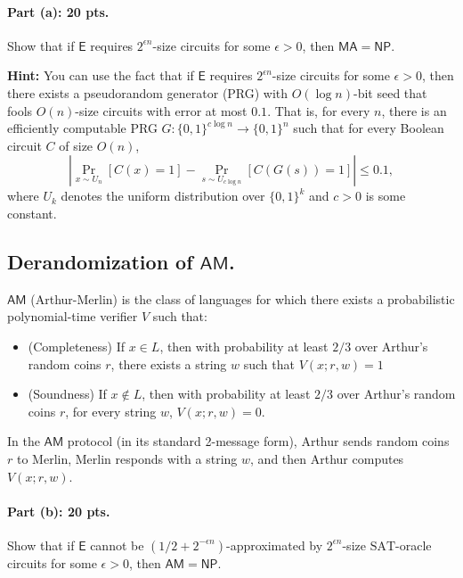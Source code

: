 \documentclass[12pt]{article}
\begin{document}
\paragraph{Part (a): 20 pts.} 

Show that if $\mathsf{E}$ requires $2^{\epsilon n}$-size circuits for some $\epsilon > 0$, then $\mathsf{MA} = \mathsf{NP}$.

\textbf{Hint:}
You can use the fact that if $\mathsf{E}$ requires $2^{\epsilon n}$-size circuits for some $\epsilon > 0$, then there exists a pseudorandom generator (PRG) with $O(\log n)$-bit seed that fools $O(n)$-size circuits with error at most $0.1$. That is, for every $n$, there is an efficiently computable PRG $G : \{0,1\}^{c\log n} \to \{0,1\}^n$ such that for every Boolean circuit $C$ of size $O(n)$,
\[
\left| \Pr_{x \sim U_n}[C(x) = 1] - \Pr_{s \sim U_{c\log n}}[C(G(s)) = 1] \right| \leq 0.1,
\]
where $U_k$ denotes the uniform distribution over $\{0,1\}^k$ and $c > 0$ is some constant.

\subsection{Derandomization of $\mathsf{AM}$.}

$\mathsf{AM}$ (Arthur-Merlin) is the class of languages for which there exists a probabilistic polynomial-time verifier $V$ such that:
\begin{itemize}
    \item (Completeness) If $x \in L$, then with probability at least $2/3$ over Arthur's random coins $r$, there exists a string $w$ such that $V(x; r, w) = 1$
    \item (Soundness) If $x \notin L$, then with probability at least $2/3$ over Arthur's random coins $r$, for every string $w$, $V(x; r, w) = 0$.
\end{itemize}
In the $\mathsf{AM}$ protocol (in its standard 2-message form), Arthur sends random coins $r$ to Merlin, Merlin responds with a string $w$, and then Arthur computes $V(x; r, w)$.


\paragraph{Part (b): 20 pts.} 

\newcommand{\SAT}{\text{SAT}}

Show that if $\mathsf{E}$ cannot be $(1/2 + 2^{-\epsilon n})$-approximated by $2^{\epsilon n}$-size $\SAT$-oracle circuits for some $\epsilon > 0$, then $\mathsf{AM} = \mathsf{NP}$.
\end{document}
